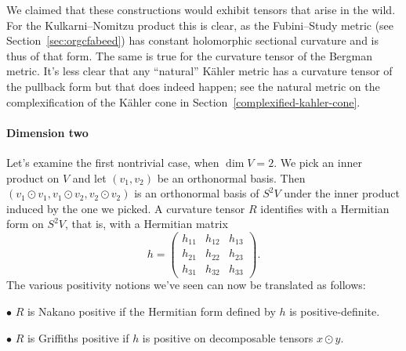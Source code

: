 \documentclass[11pt]{article}
\theoremstyle{definition}
\begin{document}
We claimed that these constructions would exhibit tensors that arise in the wild. For the Kulkarni--Nomitzu product this is clear, as the Fubini--Study metric (see Section~\ref{sec:orgcfabeed}) has constant holomorphic sectional curvature and is thus of that form. The same is true for the curvature tensor of the Bergman metric. It's less clear that any ``natural'' K\"ahler metric has a curvature tensor of the pullback form but that does indeed happen; see the natural metric on the complexification of the K\"ahler cone in Section~\ref{complexified-kahler-cone}.



\paragraph{Dimension two}

Let's examine the first nontrivial case, when $\dim V = 2$. We pick an inner product on $V$ and let $(v_1,v_2)$ be an orthonormal basis. Then $(v_1 \odot v_1, v_1 \odot v_2, v_2 \odot v_2)$ is an orthonormal basis of $S^2V$ under the inner product induced by the one we picked. A curvature tensor $R$ identifies with a Hermitian form on $S^2V$, that is, with a Hermitian matrix
$$
h = \begin{pmatrix}
  h_{11} & h_{12} & h_{13} \\
  h_{21} & h_{22} & h_{23} \\
  h_{31} & h_{32} & h_{33}
\end{pmatrix}.
$$
The various positivity notions we've seen can now be translated as follows:

\smallskip\noindent$\bullet$\quad
$R$ is Nakano positive if the Hermitian form defined by $h$ is positive-definite.

\smallskip\noindent$\bullet$\quad
  $R$ is Griffiths positive if $h$ is positive on decomposable tensors $x \odot y$.
\end{document}
